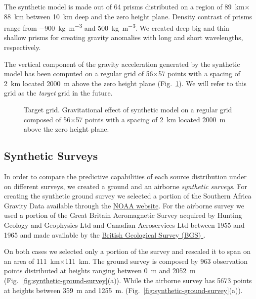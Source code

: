 \documentclass[twocolumn]{article}
\begin{document}
The synthetic model is made out of 64 prisms distributed on a region of
\SI{89}{\km}$\times$\SI{88}{\km} between \SI{10}{\km} deep and the zero
height plane.
Density contrast of prisms range from \SI{-900}{\kg\per\cubic\m} and
\SI{500}{\kg\per\cubic\m}.
We created deep big and thin shallow prisms for creating gravity anomalies with
long and short wavelengths, respectively.

The vertical component of the gravity acceleration generated by the synthetic
model has been computed on a regular grid of 56$\times$57 points with a spacing
of \SI{2}{\km} located \SI{2000}{\m} above the zero height plane
(Fig.~\ref{fig:target-grid}).
We will refer to this grid as the \emph{target} grid in the future.

\begin{figure}
    \caption{
        Target grid. Gravitational effect of synthetic model on a regular grid
        composed of 56$\times$57 points with a spacing of \SI{2}{\km} located
        \SI{2000}{\m} above the zero height plane.
    }
    \label{fig:target-grid}
\end{figure}

\subsection{Synthetic Surveys}

In order to compare the predictive capabilities of each source distribution
under on different surveys, we created a ground and an airborne \emph{synthetic
surveys}.
For creating the synthetic ground survey we selected a portion of the Southern
Africa Gravity Data available through the
\href{https://www.ngdc.noaa.gov/mgg/gravity/gravity.html}{NOAA website}.
For the airborne survey we used a portion of the Great Britain Aeromagnetic
Survey acquired by Hunting Geology and Geophysics Ltd and Canadian Aeroservices
Ltd between 1955 and 1965 and made available by the
\href{https://www.bgs.ac.uk/products/geophysics/aeromagneticRegional.html}{
British Geological Survey (BGS)
}.

On both cases we selected only a portion of the survey and rescaled it to span
on an area of \SI{111}{\km}$\times$\SI{111}{\km}.
The ground survey is composed by 963 observation points distributed at heights
ranging between \SI{0}{\m} and \SI{2052}{\m}
(Fig.~\ref{fig:synthetic-ground-survey}(a)).
While the airborne survey has 5673 points at heights between \SI{359}{\m} and
\SI{1255}{\m}.
(Fig.~\ref{fig:synthetic-ground-survey}(a)).
\end{document}
